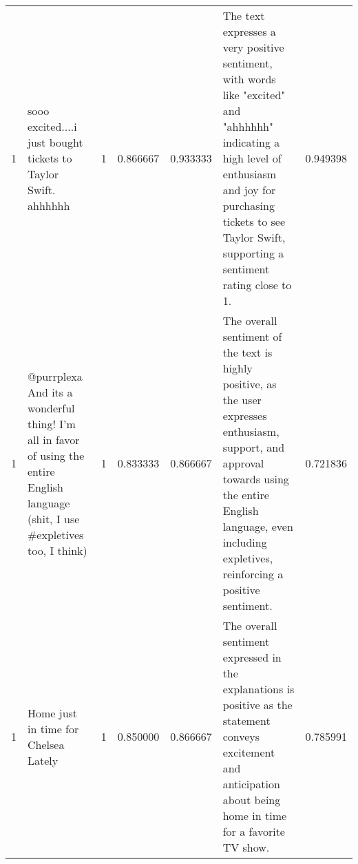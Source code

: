 \begin{tabular}{rlrrrlr}
1 & sooo excited....i just bought tickets to Taylor Swift. ahhhhhh  & 1 & 0.866667 & 0.933333 & The text expresses a very positive sentiment, with words like "excited" and "ahhhhhh" indicating a high level of enthusiasm and joy for purchasing tickets to see Taylor Swift, supporting a sentiment rating close to 1. & 0.949398 \\
1 & @purrplexa And its a wonderful thing!  I'm all in favor of using the entire English language (shit, I use #expletives too, I think)  & 1 & 0.833333 & 0.866667 & The overall sentiment of the text is highly positive, as the user expresses enthusiasm, support, and approval towards using the entire English language, even including expletives, reinforcing a positive sentiment. & 0.721836 \\
1 & Home just in time for Chelsea Lately  & 1 & 0.850000 & 0.866667 & The overall sentiment expressed in the explanations is positive as the statement conveys excitement and anticipation about being home in time for a favorite TV show. & 0.785991 \\
\bottomrule
\end{tabular}
